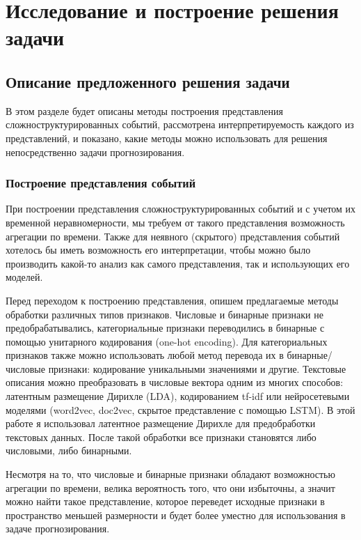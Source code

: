 \section{Исследование и построение решения задачи}
\label{sec:research_and_solving} 
\subsection{Описание предложенного решения задачи}
В этом разделе будет описаны методы построения представления сложноструктурированных событий, рассмотрена интерпретируемость каждого из представлений, и показано, какие методы можно использовать для решения  непосредственно задачи прогнозирования.

\subsubsection{Построение представления событий}
\label{subsub:repr}
При построении представления сложноструктурированных событий и с учетом их временной неравномерности,
мы требуем от такого представления возможность агрегации по времени. Также для неявного (скрытого) представления событий хотелось бы иметь возможность его интерпретации, чтобы можно было производить какой-то анализ как самого представления, так и использующих его моделей.

Перед переходом к построению представления, опишем предлагаемые методы обработки различных типов признаков.
Числовые и бинарные признаки не предобрабатывались, категориальные признаки переводились в бинарные с помощью унитарного кодирования (one-hot encoding). Для категориальных признаков также можно использовать любой метод перевода их в бинарные/числовые признаки: кодирование уникальными значениями и другие.
Текстовые описания можно преобразовать в числовые вектора одним из многих способов: латентным размещение Дирихле (LDA), кодированием tf-idf или нейросетевыми моделями (word2vec, doc2vec, скрытое представление с помощью LSTM). В этой работе я использовал латентное размещение Дирихле для предобработки текстовых данных. После такой обработки все признаки становятся либо числовыми, либо бинарными.

Несмотря на то, что числовые и бинарные признаки обладают возможностью агрегации по времени, велика вероятность того, что они избыточны, а значит можно найти такое представление, которое переведет исходные признаки в пространство меньшей размерности и будет более уместно для использования в задаче прогнозирования. 


